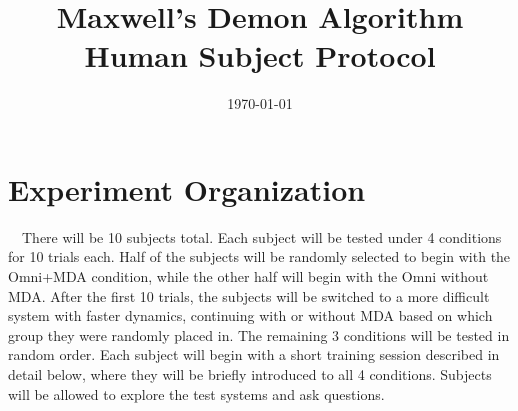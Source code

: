 \documentclass[11pt]{article}
\begin{document}
\title{Maxwell's Demon Algorithm Human Subject Protocol}
\author{}
\date{\today}
\maketitle
\section{Experiment Organization}

\	\	There will be 10 subjects total. Each subject will be tested under 4 conditions for 10 trials each. Half of the subjects will be randomly selected to begin with the Omni+MDA condition, while the other half will begin with the Omni without MDA. After the first 10 trials, the subjects will be switched to a more difficult system with faster dynamics, continuing with or without MDA based on which group they were randomly placed in. The remaining 3 conditions will be tested in random order. Each subject will begin with a short training session described in detail below, where they will be briefly introduced to all 4 conditions. Subjects will be allowed to explore the test systems and ask questions.
\end{document}
